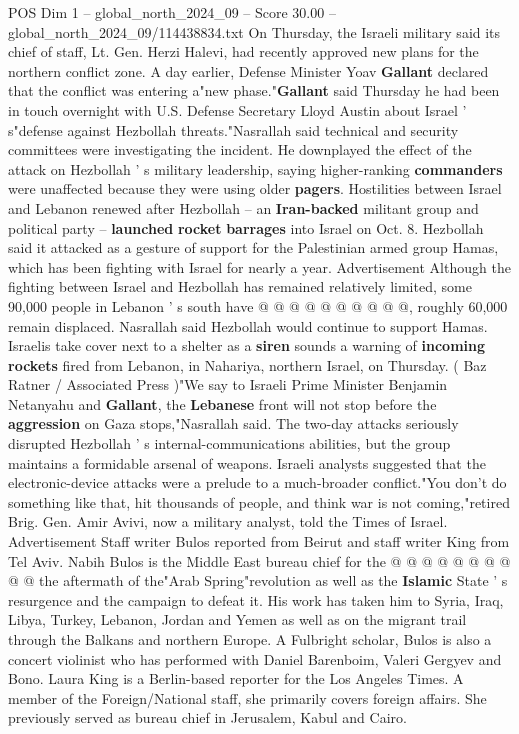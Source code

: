 \begin{textsample}{POS Dim 1 – global\_north\_2024\_09 – Score 30.00 – global\_north\_2024\_09/114438834.txt}
On Thursday, the Israeli military said its chief of staff, Lt.
Gen.
Herzi Halevi, had recently approved new plans for the northern conflict zone.
A day earlier, Defense Minister Yoav \textbf{Gallant} declared that the conflict was entering a"new phase."\textbf{Gallant} said Thursday he had been in touch overnight with U.S.
Defense Secretary Lloyd Austin about Israel ' s"defense against Hezbollah threats."Nasrallah said technical and security committees were investigating the incident.
He downplayed the effect of the attack on Hezbollah ' s military leadership, saying higher-ranking \textbf{commanders} were unaffected because they were using older \textbf{pagers}.
Hostilities between Israel and Lebanon renewed after Hezbollah -- an \textbf{Iran-backed} militant group and political party -- \textbf{launched} \textbf{rocket} \textbf{barrages} into Israel on Oct. 8.
Hezbollah said it attacked as a gesture of support for the Palestinian armed group Hamas, which has been fighting with Israel for nearly a year.
Advertisement Although the fighting between Israel and Hezbollah has remained relatively limited, some 90,000 people in Lebanon ' s south have @ @ @ @ @ @ @ @ @ @, roughly 60,000 remain displaced.
Nasrallah said Hezbollah would continue to support Hamas.
Israelis take cover next to a shelter as a \textbf{siren} sounds a warning of \textbf{incoming} \textbf{rockets} fired from Lebanon, in Nahariya, northern Israel, on Thursday. ( Baz Ratner / Associated Press )"We say to Israeli Prime Minister Benjamin Netanyahu and \textbf{Gallant}, the \textbf{Lebanese} front will not stop before the \textbf{aggression} on Gaza stops,"Nasrallah said.
The two-day attacks seriously disrupted Hezbollah ' s internal-communications abilities, but the group maintains a formidable arsenal of weapons.
Israeli analysts suggested that the electronic-device attacks were a prelude to a much-broader conflict."You don't do something like that, hit thousands of people, and think war is not coming,"retired Brig.
Gen.
Amir Avivi, now a military analyst, told the Times of Israel.
Advertisement Staff writer Bulos reported from Beirut and staff writer King from Tel Aviv.
Nabih Bulos is the Middle East bureau chief for the @ @ @ @ @ @ @ @ @ @ the aftermath of the"Arab Spring"revolution as well as the \textbf{Islamic} State ' s resurgence and the campaign to defeat it.
His work has taken him to Syria, Iraq, Libya, Turkey, Lebanon, Jordan and Yemen as well as on the migrant trail through the Balkans and northern Europe.
A Fulbright scholar, Bulos is also a concert violinist who has performed with Daniel Barenboim, Valeri Gergyev and Bono.
Laura King is a Berlin-based reporter for the Los Angeles Times.
A member of the Foreign/National staff, she primarily covers foreign affairs.
She previously served as bureau chief in Jerusalem, Kabul and Cairo.

\end{textsample}
